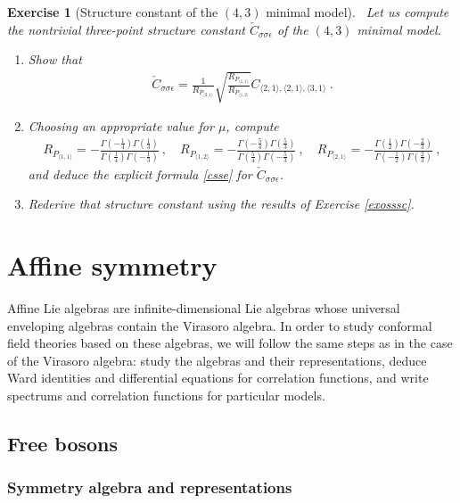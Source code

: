 \documentclass[12pt, a4paper, notitlepage, twoside]{report}
\numberwithin{equation}{section}
\theoremstyle{break}
\newtheorem{exo}{Exercise}[chapter]
\begin{document}
\begin{exo}[Structure constant of the $(4,3)$ minimal model]
 ~\label{exocsse}
 Let us compute the nontrivial three-point structure constant $\check{C}_{\sigma\sigma\epsilon} $ of the $(4,3)$ minimal model.
 \begin{enumerate}
  \item Show that 
\begin{align}
 \check{C}_{\sigma\sigma\epsilon} = \frac{1}{R_{P_{\langle 2,1 \rangle}}}\sqrt{\frac{R_{P_{\langle 1,1 \rangle}}}{R_{P_{\langle 1,2 \rangle}}}} C_{\langle 2,1\rangle , \langle 2,1 \rangle,\langle 3,1 \rangle}\ .
\end{align}
\item Choosing an appropriate value for $\mu$, compute
\begin{align}
 R_{P_{\langle 1,1 \rangle}} = -\frac{\Gamma(-\frac14)\Gamma(\frac13)}{\Gamma(\frac14)\Gamma(-\frac13)} \ , \quad R_{P_{\langle 1,2 \rangle}} = -\frac{\Gamma(-\frac54)\Gamma(\frac53)}{\Gamma(\frac54)\Gamma(-\frac53)} \ , \quad R_{P_{\langle 2,1 \rangle}} = -\frac{\Gamma(\frac12)\Gamma(-\frac23)}{\Gamma(-\frac12)\Gamma(\frac23)}\ ,
\end{align}
and deduce the explicit formula \eqref{csse} for $\check{C}_{\sigma\sigma\epsilon}$.
\item Rederive that structure constant using the results of Exercise \ref{exosssc}.
 \end{enumerate}
\end{exo}


\chapter{Affine symmetry \label{secaff}}

Affine Lie algebras are infinite-dimensional Lie algebras whose universal enveloping algebras contain the Virasoro algebra.
In order to study conformal field theories based on these algebras, we will follow the same steps as in the case of the Virasoro algebra: study the algebras and their representations, deduce Ward identities and differential equations for correlation functions, and write spectrums and correlation functions for particular models. 

\section{Free bosons}

\subsection{Symmetry algebra and representations \label{secaua}}
\end{document}
